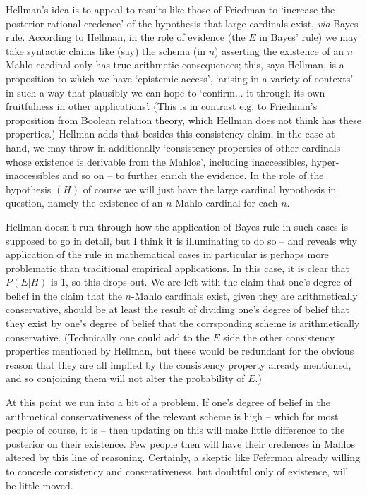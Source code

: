 \documentclass{amsart}
\theoremstyle{definition}
\begin{document}
Hellman's idea is to appeal to results like those of Friedman 
to `increase the posterior rational credence' of the hypothesis that large 
cardinals exist, \emph{via}  Bayes rule. According to Hellman, 
in the role of evidence (the $E$ in Bayes' rule) we may take syntactic 
claims like (say) the schema (in $n$) asserting the existence of an $n$ Mahlo cardinal
only has true arithmetic consequences; this, says Hellman, is a proposition to which 
we have `epistemic access', `arising in a variety of contexts' in such a way that
plausibly we can hope to `confirm... it through its own fruitfulness in other applications'.
(This is in contrast e.g. to Friedman's proposition from Boolean relation theory,
which Hellman does not think has these properties.) Hellman adds that besides this
consistency claim, in the case at hand, we may throw in additionally `consistency 
properties of other cardinals whose existence is derivable from the Mahlos', 
including inaccessibles, hyper-inaccessibles and so on -- 
to further enrich the evidence. In the role of the hypothesis $(H)$ of course
we will just have the large cardinal hypothesis in question, namely 
the existence of an $n$-Mahlo cardinal for each $n$. 

Hellman doesn't run through how the application of Bayes rule in 
such cases is supposed to go in detail, but I think it is illuminating to do so 
-- and reveals why application of the rule in mathematical cases in particular 
is perhaps more problematic than traditional empirical applications. 
In this case, it is clear that $P(E|H)$ is 1, so this drops out. 
We are left with the claim that one's degree of belief in the claim that 
the $n$-Mahlo cardinals exist, given they are arithmetically conservative, should be at least 
the result of dividing one's degree of belief that they exist by 
one's degree of belief that the corrsponding scheme is arithmetically conservative. (Technically
one could add to the $E$ side the other consistency properties mentioned by Hellman,
but these would be redundant for the obvious reason that they are all implied by 
the consistency property already mentioned, and so conjoining them
will not alter the probability of $E$.)

At this point we run into a bit of a problem. If one's degree of belief 
in the arithmetical conservativeness of the relevant scheme is high -- which for most people 
of course, it is -- then updating on this will make little difference to the 
posterior on their existence. Few people then will have their credences in 
Mahlos altered by this line of reasoning. Certainly, a skeptic like Feferman already
willing to concede consistency and conserativeness, 
but doubtful only of existence, will be little moved.
\end{document}
